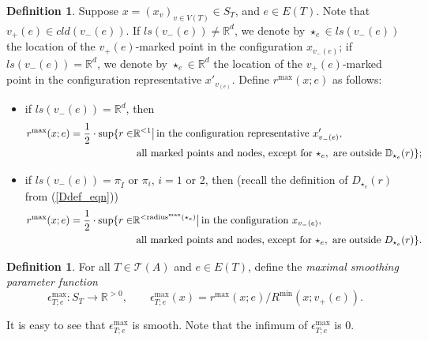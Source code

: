 \documentclass[11pt]{article}
\theoremstyle{definition}
\newtheorem{dfn}[thm]{Definition}
\theoremstyle{remark}
\def\R{\mathbb{R}}
\def\D{\mathbb{D}}
\def\cT{\mathcal{T}}
\def\rI{{\mathring{I}}}
\def\tn#1{\textnormal{#1}}
\begin{document}
\begin{dfn}\label{rmax_dfn}
Suppose $x=(x_v)_{v\in V(T)}\in S_T$, and $e\in E(T)$. Note that $v_+(e)\in cld(v_-(e))$. If $ls(v_-(e))\neq\R^d$, we denote by $\star_e\in ls(v_-(e))$ the location of the $v_+(e)$-marked point in the configuration $x_{v_-(e)}$; if $ls(v_-(e))=\R^d$, we denote by $\star_e\in\R^d$ the location of the $v_+(e)$-marked point in the configuration representative $x'_{v_(e)}$. 
Define $r^{\max}(x;e)$ as follows:
\begin{itemize}
\item if $ls(v_-(e))=\R^d$, then 
\begin{align*}
r^{\max}(x;e)=\frac{1}{2}\cdot\sup\{r\in&\R^{<1}\big|\,\tn{in the configuration representative }x'_{v_-(e)},\\
&\tn{ all marked points and nodes, except for }\star_e, \tn{ are outside }\D_{\star_e}(r)\};
\end{align*}
\item if $ls(v_-(e))=\pi_\rI$ or $\pi_i$, $i=1$ or 2, 
then (recall the definition of $D_{\star_e}(r)$ from (\ref{Ddef_eqn}))
\begin{align*}
r^{\max}(x;e)=\frac{1}{2}\cdot\sup\{r\in&\R^{<\tn{radius}^{\max}(\star_e)}\big|\,\tn{in the configuration }x_{v_-(e)},\\
&\tn{ all marked points and nodes, except for }\star_e, \tn{ are outside }D_{\star_e}(r)\}.
\end{align*}
\end{itemize}
\end{dfn}

\begin{dfn}
For all $T\in\cT(A)$ and $e\in E(T)$, define the {\it maximal smoothing parameter function}
$$\epsilon^{\max}_{T;e}:S_T\longrightarrow \R^{>0},\qquad \epsilon^{\max}_{T;e}(x)=r^{\max}(x;e)\big/R^{\min}(x;v_+(e)).$$
\end{dfn}
It is easy to see that $\epsilon^{\max}_{T;e}$ is smooth. Note that the infimum of $\epsilon^{\max}_{T;e}$ is 0. 

\end{document}
